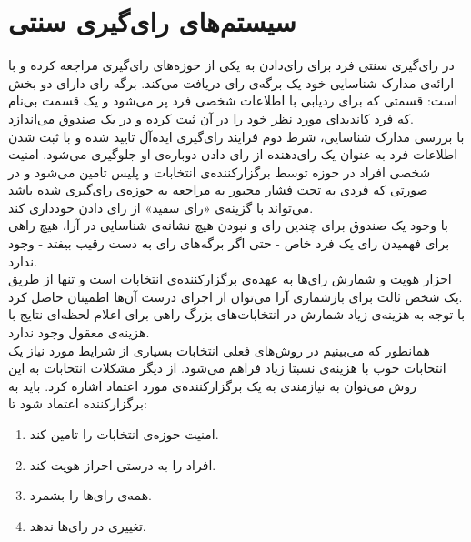 \section{سیستم‌های رای‌گیری سنتی}
\par
در رای‌گیری سنتی فرد برای رای‌دادن به یکی از حوزه‌های رای‌گیری مراجعه کرده و با ارائه‌ی مدارک شناسایی خود یک برگه‌ی رای دریافت می‌کند. برگه رای دارای دو بخش است: قسمتی که برای ردیابی با اطلاعات شخصی فرد پر می‌شود و یک قسمت بی‌نام که فرد کاندیدای مورد نظر خود را در آن ثبت کرده و در یک صندوق می‌اندازد. 
\\
با بررسی مدارک شناسایی، شرط دوم فرایند رای‌گیری ایده‌آل تایید شده و با ثبت شدن اطلاعات فرد به عنوان یک رای‌دهنده از رای دادن دوباره‌ی او جلوگیری می‌شود. امنیت شخصی افراد در حوزه توسط برگزارکننده‌ی انتخابات و پلیس تامین می‌شود و در صورتی که فردی به تحت فشار مجبور به مراجعه به حوزه‌ی رای‌گیری شده باشد می‌تواند با گزینه‌ی «رای‌ سفید» از رای دادن خودداری کند.
\\
با وجود یک صندوق برای چندین رای و نبودن هیچ نشانه‌ی شناسایی در آرا، هیچ راهی برای فهمیدن رای یک فرد خاص - حتی اگر برگه‌های رای به دست رقیب بیفتد - وجود ندارد. 
\\
احزار هویت و شمارش رای‌ها به عهده‌ی برگزارکننده‌ی انتخابات است و تنها از طریق یک شخص ثالث برای باز‌شماری آرا می‌توان از اجرای درست آن‌ها اطمینان حاصل کرد.
\\
با توجه به هزینه‌ی زیاد شمارش در انتخابات‌های بزرگ راهی برای اعلام لحظه‌ا‌ی نتایج با هزینه‌ی معقول وجود ندارد.
\\
همانطور که می‌بینیم در روش‌های فعلی انتخابات بسیاری از شرایط مورد نیاز یک انتخابات خوب  با هزینه‌ی نسبتا زیاد فراهم می‌شود. از دیگر مشکلات انتخابات به این روش می‌توان به نیازمندی به یک برگزارکننده‌ی مورد اعتماد اشاره کرد. باید به برگزارکننده اعتماد شود تا: 
\begin{enumerate}
	\item 
	امنیت حوزه‌ی انتخابات را تامین کند.
	\item 
	افراد را به درستی احراز هویت کند.
	\item 
	همه‌ی رای‌ها را بشمرد.
	\item 
	تغییری در رای‌ها ندهد.
	
\end{enumerate}
 

